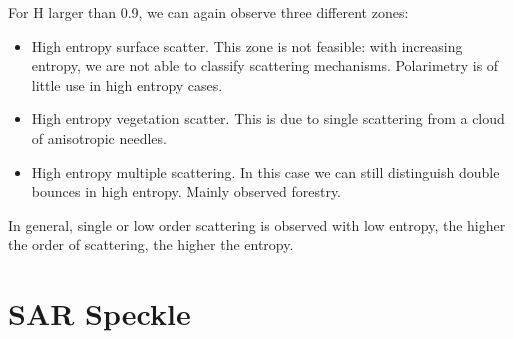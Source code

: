 \documentclass[11pt]{article}
\begin{document}
For H larger than  0.9, we can again observe three different zones:
\begin{itemize}
	\item High entropy surface scatter. This zone is not feasible: with increasing entropy, we are not able to classify scattering mechanisms. Polarimetry is of little use in high entropy cases.
	\item High entropy vegetation scatter. This is due to single scattering from a cloud of anisotropic needles.
	\item High entropy multiple scattering. In this case we can still distinguish double bounces in high entropy. Mainly observed forestry.
\end{itemize}
In general, single or low order scattering is observed with low entropy, the higher the order of scattering, the higher the entropy.


\section{SAR Speckle}
\end{document}
